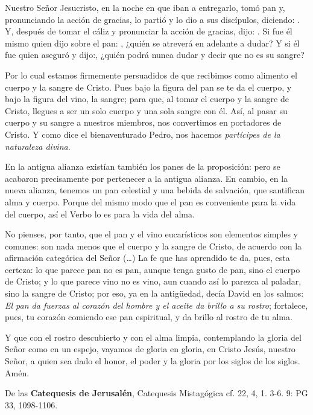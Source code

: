 \begin{patercite}
	Nuestro Señor Jesucristo, en la noche en que iban a entregarlo, tomó	pan y, pronunciando la acción de gracias, lo partió y lo dio a sus discípulos, diciendo: . Y, después de	tomar el cáliz y pronunciar la acción de gracias, dijo: . Si fue él mismo quien dijo sobre el pan: , ¿quién se atreverá en adelante a dudar? Y si él fue quien	aseguró y dijo:, ¿quién podrá nunca dudar y decir	que no es su sangre?
	
	Por lo cual estamos firmemente persuadidos de que recibimos como alimento el cuerpo y la sangre de Cristo. Pues bajo la figura del pan se te da el cuerpo, y bajo la figura del vino, la sangre; para que, al	tomar el cuerpo y la sangre de Cristo, llegues a ser un solo cuerpo y	una sola sangre con él. Así, al pasar su cuerpo y su sangre a nuestros	miembros, nos convertimos en portadores de Cristo. Y como dice el	bienaventurado Pedro, nos hacemos \textit{partícipes de la naturaleza divina}.
	
	En la antigua alianza existían también los panes de la proposición: pero	se acabaron precisamente por pertenecer a la antigua alianza. En cambio,	en la nueva alianza, tenemos un pan celestial y una bebida de salvación,	que santifican alma y cuerpo. Porque del mismo modo que el pan es	conveniente para la vida del cuerpo, así el Verbo lo es para la vida del alma.
	
	No pienses, por tanto, que el pan y el vino eucarísticos son elementos simples y comunes: son nada menos que el cuerpo y la sangre de Cristo, de acuerdo con la afirmación categórica del Señor (\ldots) {La fe que has aprendido te da, pues, esta certeza: lo que parece pan no	es pan, aunque tenga gusto de pan, sino el cuerpo de Cristo; y lo que	parece vino no es vino, aun cuando así lo parezca al paladar, sino la	sangre de Cristo; por eso, ya en la antigüedad, decía David en los salmos: \textit{El pan da fuerzas al corazón del hombre y el aceite da brillo	a su rostro}; fortalece, pues, tu corazón comiendo ese pan espiritual,	y da brillo al rostro de tu alma.}
	
	Y que con el rostro descubierto y con el alma limpia, contemplando la	gloria del Señor como en un espejo, vayamos de gloria en gloria, en	Cristo Jesús, nuestro Señor, a quien sea dado el honor, el poder y la	gloria por los siglos de los siglos. Amén.
	
	De las \textbf{Catequesis de Jerusalén}, Catequesis Mistagógica cf. 22, 4, 1. 3-6. 9: PG 33, 1098-1106.
\end{patercite}

